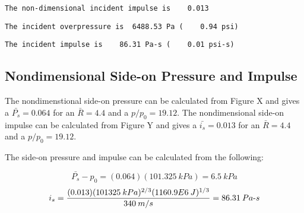 \documentclass[10pt,parskip=half,
toc=sectionentrywithdots,
bibliography=totocnumbered,
captions=tableheading,numbers=noendperiod]{scrartcl}
\begin{document}
\begin{lstlisting}[language={},postbreak={},numbers=none,xrightmargin=7pt,belowskip=5pt,aboveskip=5pt,breakindent=0pt]
The non-dimensional incident impulse is    0.013

\end{lstlisting}

\begin{figure}[H]\begin{center}\end{center}\end{figure}

\begin{lstlisting}[language={},postbreak={},numbers=none,xrightmargin=7pt,belowskip=5pt,aboveskip=5pt,breakindent=0pt]
The incident overpressure is  6488.53 Pa (    0.94 psi)

\end{lstlisting}

\begin{lstlisting}[language={},postbreak={},numbers=none,xrightmargin=7pt,belowskip=5pt,aboveskip=5pt,breakindent=0pt]
The incident impulse is    86.31 Pa-s (    0.01 psi-s)

\end{lstlisting}

\hypertarget{nondimensional-side-on-pressure-and-impulse}{%
\subsection{Nondimensional Side-on Pressure and
Impulse}\label{nondimensional-side-on-pressure-and-impulse}}

The nondimenstional side-on pressure can be calculated from Figure X and
gives a \(\bar{P_s} = 0.064\) for an \(\bar{R}=4.4\) and a
\(p/p_0 = 19.12\). The nondimensional side-on impulse can be calculated
from Figure Y and gives a \(\bar{i_s} = 0.013\) for an \(\bar{R}=4.4\)
and a \(p/p_0 = 19.12\).

The side-on pressure and impulse can be calculated from the following:

\begin{equation}\bar{P_s} - p_0 = (0.064)(101.325\:kPa) = 6.5\:kPa\end{equation}
\begin{equation}i_s = \frac{(0.013)(101325\:kPa)^{2/3}(1160.9E6\:J)^{1/3}}{340\:m/s}= 86.31\:Pa {\text -} s\end{equation}



\end{document}
